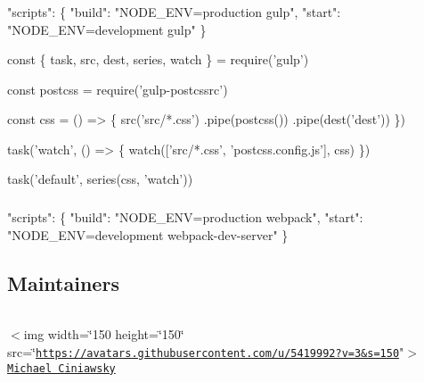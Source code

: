 \subsubsection*{}


\begin{DoxyCode}
"scripts": \{
  "build": "NODE\_ENV=production gulp",
  "start": "NODE\_ENV=development gulp"
\}
\end{DoxyCode}



\begin{DoxyCode}
const \{ task, src, dest, series, watch \} = require('gulp')

const postcss = require('gulp-postcssrc')

const css = () => \{
  src('src/*.css')
    .pipe(postcss())
    .pipe(dest('dest'))
\})

task('watch', () => \{
  watch(['src/*.css', 'postcss.config.js'], css)
\})

task('default', series(css, 'watch'))
\end{DoxyCode}


\subsubsection*{}


\begin{DoxyCode}
"scripts": \{
  "build": "NODE\_ENV=production webpack",
  "start": "NODE\_ENV=development webpack-dev-server"
\}
\end{DoxyCode}





\subsection*{Maintainers}

\tabulinesep=1mm
\begin{longtabu} spread 0pt [c]{*{0}{|X[-1]}|}
\hline
\end{longtabu}


$<$img width=\char`\"{}150 height=\char`\"{}150\char`\"{}
        src=\char`\"{}\href{https://avatars.githubusercontent.com/u/5419992?v=3&s=150}{\tt https\+://avatars.\+githubusercontent.\+com/u/5419992?v=3\&s=150}"$>$ ~\newline
 \href{https://github.com/michael-ciniawsky}{\tt Michael Ciniawsky}  

